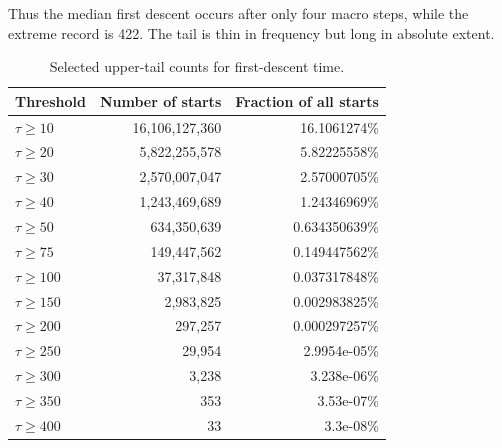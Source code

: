 \documentclass[11pt]{article}
\theoremstyle{definition}
\begin{document}
Thus the median first descent occurs after only four macro steps, while the extreme record is 422. The tail is thin in frequency but long in absolute extent.

\begin{table}[H]
\centering
\caption{Selected upper-tail counts for first-descent time.}
\begin{tabular}{lrr}
\toprule
Threshold & Number of starts & Fraction of all starts\\
\midrule
$\tau\ge 10$ & 16{,}106{,}127{,}360 & 16.1061274\% \\
$\tau\ge 20$ & 5{,}822{,}255{,}578 & 5.82225558\% \\
$\tau\ge 30$ & 2{,}570{,}007{,}047 & 2.57000705\% \\
$\tau\ge 40$ & 1{,}243{,}469{,}689 & 1.24346969\% \\
$\tau\ge 50$ & 634{,}350{,}639 & 0.634350639\% \\
$\tau\ge 75$ & 149{,}447{,}562 & 0.149447562\% \\
$\tau\ge 100$ & 37{,}317{,}848 & 0.037317848\% \\
$\tau\ge 150$ & 2{,}983{,}825 & 0.002983825\% \\
$\tau\ge 200$ & 297{,}257 & 0.000297257\% \\
$\tau\ge 250$ & 29{,}954 & 2.9954e-05\% \\
$\tau\ge 300$ & 3{,}238 & 3.238e-06\% \\
$\tau\ge 350$ & 353 & 3.53e-07\% \\
$\tau\ge 400$ & 33 & 3.3e-08\% \\
\bottomrule
\end{tabular}
\end{table}
\end{document}
